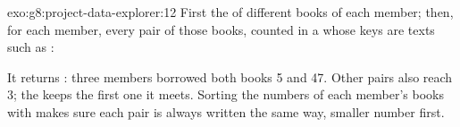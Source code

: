 \begin{solution}{exo:g8:project-data-explorer:12}
First the  of different books of each member; then, for each member,
every pair of those books, counted in a  whose keys are texts such
as :

\label{lst:g8:project-data-explorer:sol-pair}

It returns : three members borrowed both books 5 and 47.
Other pairs also reach 3; the  keeps the first one it meets. Sorting
the numbers of each member's books with  makes sure each pair is
always written the same way, smaller number first.
\end{solution}
